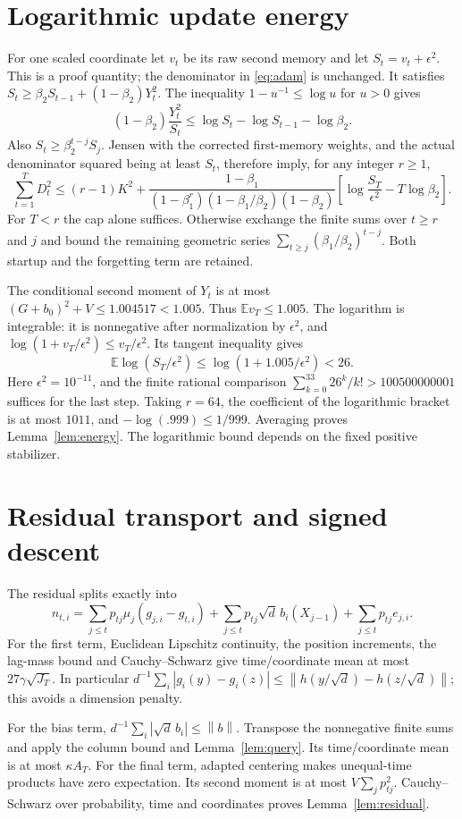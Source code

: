 \documentclass[11pt]{article}
\newcommand{\E}{\mathbb E}
\newcommand{\norm}[1]{\left\|#1\right\|}
\begin{document}
\section{Logarithmic update energy}
For one scaled coordinate let $v_t$ be its raw second memory and let
$S_t=v_t+\epsilon^2$. This is a proof quantity; the denominator in
\eqref{eq:adam} is unchanged.
It satisfies $S_t\ge\beta_2S_{t-1}+(1-\beta_2)Y_t^2$.
The inequality $1-u^{-1}\le\log u$ for $u>0$ gives
\[
 (1-\beta_2)\frac{Y_t^2}{S_t}
 \le\log S_t-\log S_{t-1}-\log\beta_2.
\]
Also $S_t\ge\beta_2^{t-j}S_j$. Jensen with the corrected first-memory weights,
and the actual denominator squared being at least $S_t$, therefore imply,
for any integer $r\ge1$,
\[
 \sum_{t=1}^T D_t^2
 \le(r-1)K^2+\frac{1-\beta_1}
 {(1-\beta_1^r)(1-\beta_1/\beta_2)(1-\beta_2)}
 \left[\log\frac{S_T}{\epsilon^2}-T\log\beta_2\right].
\]
For $T<r$ the cap alone suffices. Otherwise exchange the finite sums over
$t\ge r$ and $j$ and bound the remaining geometric series
$\sum_{t\ge j}(\beta_1/\beta_2)^{t-j}$.
Both startup and the forgetting term are retained.

The conditional second moment of $Y_t$ is at most
$(G+b_0)^2+V\le1.004517<1.005$. Thus $\E v_T\le1.005$.
The logarithm is integrable: it is nonnegative after normalization by
$\epsilon^2$, and $\log(1+v_T/\epsilon^2)\le v_T/\epsilon^2$.
Its tangent inequality gives
\[
 \E\log(S_T/\epsilon^2)\le\log(1+1.005/\epsilon^2)<26.
\]
Here $\epsilon^2=10^{-11}$, and the finite rational comparison
$\sum_{k=0}^{33}26^k/k!>100500000001$ suffices for the last step.
Taking $r=64$, the coefficient of the logarithmic bracket is at most $1011$,
and $-\log(.999)\le1/999$. Averaging proves Lemma~\ref{lem:energy}.
The logarithmic bound depends on the fixed positive stabilizer.

\section{Residual transport and signed descent}
The residual splits exactly into
\[
 n_{t,i}=\sum_{j\le t}p_{tj}\mu_j(g_{j,i}-g_{t,i})
          +\sum_{j\le t}p_{tj}\sqrt d\,b_i(X_{j-1})
          +\sum_{j\le t}p_{tj}e_{j,i}.
\]
For the first term, Euclidean Lipschitz continuity, the position increments,
the lag-mass bound and Cauchy--Schwarz give time/coordinate mean at most
$27\gamma\sqrt{J_T}$. In particular
$d^{-1}\sum_i|g_i(y)-g_i(z)|
 \le\norm{h(y/\sqrt d)-h(z/\sqrt d)}$; this avoids a dimension penalty.

For the bias term,
$d^{-1}\sum_i|\sqrt d\,b_i|\le\norm b$.
Transpose the nonnegative finite sums and apply the column bound and
Lemma~\ref{lem:query}. Its time/coordinate mean is at most $\kappa A_T$.
For the final term, adapted centering makes unequal-time products have zero
expectation. Its second moment is at most $V\sum_jp_{tj}^2$.
Cauchy--Schwarz over probability, time and coordinates proves
Lemma~\ref{lem:residual}.
\end{document}
